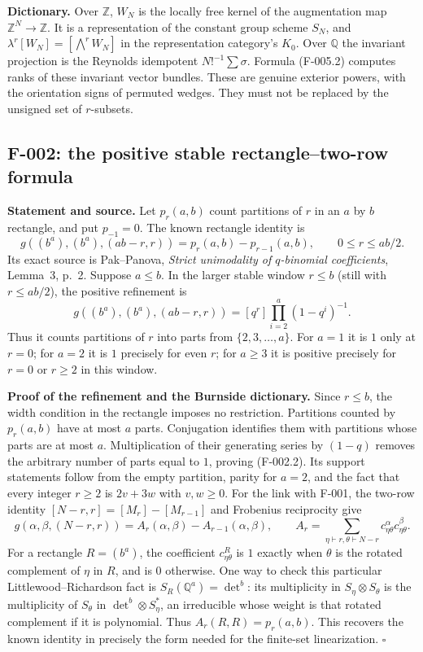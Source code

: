 \textbf{Dictionary.}
Over $\mathbb Z$, $W_N$ is the locally free kernel of the augmentation map
$\mathbb Z^N\to\mathbb Z$. It is a representation of the constant group
scheme $S_N$, and $\lambda^r[W_N]=[\bigwedge^rW_N]$ in the representation
category's $K_0$. Over $\mathbb Q$ the invariant projection is the Reynolds
idempotent $N!^{-1}\sum\sigma$. Formula (F-005.2) computes ranks of these
invariant vector bundles. These are genuine exterior powers, with the
orientation signs of permuted wedges. They must not be replaced by the
unsigned set of $r$-subsets.

\subsection{F-002: the positive stable rectangle--two-row formula}
\textbf{Statement and source.}
Let $p_r(a,b)$ count partitions of $r$ in an $a$ by $b$ rectangle, and put
$p_{-1}=0$. The known rectangle identity is
\[
 g((b^a),(b^a),(ab-r,r))=p_r(a,b)-p_{r-1}(a,b),
 \qquad 0\leq r\leq ab/2.                            \tag{F-002.1}
\]
Its exact source is Pak--Panova, \emph{Strict unimodality of $q$-binomial
coefficients}, Lemma~3, p.~2. Suppose $a\leq b$. In the larger stable window
$r\leq b$ (still with $r\leq ab/2$), the positive refinement is
\[
 g((b^a),(b^a),(ab-r,r))
 =[q^r]\prod_{i=2}^a(1-q^i)^{-1}.                    \tag{F-002.2}
\]
Thus it counts partitions of $r$ into parts from $\{2,3,\ldots,a\}$.
For $a=1$ it is $1$ only at $r=0$; for $a=2$ it is $1$ precisely for even
$r$; for $a\geq3$ it is positive precisely for $r=0$ or $r\geq2$ in this
window.

\textbf{Proof of the refinement and the Burnside dictionary.}
Since $r\leq b$, the width condition in the rectangle imposes no restriction.
Partitions counted by $p_r(a,b)$ have at most $a$ parts. Conjugation
identifies them with partitions whose parts are at most $a$.
Multiplication of their generating series by $(1-q)$ removes the arbitrary
number of parts equal to $1$, proving (F-002.2). Its support statements
follow from the empty partition, parity for $a=2$, and the fact that every
integer $r\geq2$ is $2v+3w$ with $v,w\geq0$.
For the link with F-001, the two-row identity
$[N-r,r]=[M_r]-[M_{r-1}]$ and Frobenius reciprocity give
\[
 g(\alpha,\beta,(N-r,r))=A_r(\alpha,\beta)-A_{r-1}(\alpha,\beta),\qquad
 A_r=\sum_{\eta\vdash r,\theta\vdash N-r}
 c^\alpha_{\eta\theta}c^\beta_{\eta\theta}.
\]
For a rectangle $R=(b^a)$, the coefficient $c^R_{\eta\theta}$ is $1$ exactly
when $\theta$ is the rotated complement of $\eta$ in $R$, and is $0$
otherwise. One way to check this particular Littlewood--Richardson fact is
$S_R(\mathbb Q^a)=\det^b$: its multiplicity in
$S_\eta\otimes S_\theta$ is the multiplicity of $S_\theta$ in
$\det^b\otimes S_\eta^*$, an irreducible whose weight is that rotated
complement if it is polynomial. Thus $A_r(R,R)=p_r(a,b)$.
This recovers the known identity in precisely the form needed for the
finite-set linearization. \hfill$\square$

